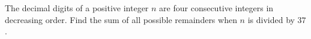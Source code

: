 The decimal digits of a positive integer $n$ are four consecutive integers in decreasing order. Find the sum of all possible remainders when $n$ is divided by $37$.
